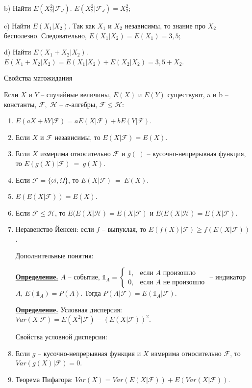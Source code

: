 \documentclass[a4paper]{article}
\begin{document}
\par b) Найти $E(X_2^2|\mathcal{F}_J)$. $E(X_2^2|\mathcal{F}_J)=X_2^2$;\\
\par c) Найти $E(X_1|X_2)$. Так как $X_1$ и $X_2$ независимы, то знание про $X_2$ бесполезно. Следовательно, $E(X_1|X_2)=E(X_1)=3,5$;\\
\par d) Найти $E(X_1+X_2|X_2)$. $E(X_1+X_2|X_2)=E(X_1|X_2)+E(X_2|X_2)=3,5+X_2$.\\
\begin{center}{\large Свойства матожидания}\end{center}
\par Если $X$ и $Y$ -- случайные величины, $E(X)$ и $E(Y)$ существуют, a и b -- константы, $\mathcal{F},\;\mathcal{H}$ -- $\sigma$-алгебры, $\mathcal{F}\leq\mathcal{H}$:
\begin{enumerate}
\item $E(aX+bY|\mathcal{F})=aE(X|\mathcal{F})+bE(Y|\mathcal{F})$.
\item Если $X$ и $\mathcal{F}$ независимы, то $E(X|\mathcal{F})=E(X)$.
\item Если $X$ измерима относительно $\mathcal{F}$ и $g(\;)$ -- кусочно-непрерывная функция, то $E(g(X)|\mathcal{F})~=~g(X)$.
\item Если $\mathcal{F}=\{\varnothing,\Omega\}$, то $E(X|\mathcal{F})~=~E(X)$.
\item $E(E(X|\mathcal{F}))=E(X).$
\item Если $\mathcal{F}\leq\mathcal{H}$, то $E(E(X|\mathcal{H})=E(X|\mathcal{F})$ и $E(E(X|\mathcal{H})=E(X|\mathcal{F})$.
\item Неравенство Йенсен: если $f$ -- выпуклая, то $E(f(X)|\mathcal{F})\geq f(E(X|\mathcal{F}))$.\\
\par Дополнительные понятия:\\
 \par {\bf\underline{Определение.}} $A$ -- событие, $\mathbb{1}_A=\begin{cases}1,&\text{если $A$ произошло}\\
 0,&\text{если $A$ не произошло}\end{cases}$ -- индикатор $A$, $E(\mathbb{1}_A)=P(A)$. Тогда $P(A|\mathcal{F})=E(\mathbb{1}_A|\mathcal{F})$.\\
  \par {\bf\underline{Определение.}} Условная дисперсия: $Var(X|\mathcal{F})=E(X^2|\mathcal{F})-(E(X|\mathcal{F}))^2$.\\
  \par Свойства условной дисперсии:
  \item Если $g$ -- кусочно-непрерывная функция и $X$ измерима относительно $\mathcal{F}$, то $Var(g(X)|\mathcal{F})=0$.
  \item Теорема Пифагора: $Var(X)=Var(E(X|\mathcal{F}))+E(Var(X|\mathcal{F}))$.
\end{enumerate}
\end{document}
